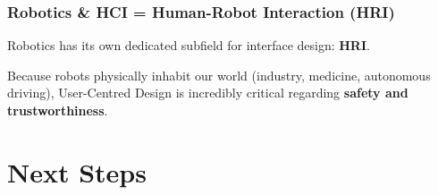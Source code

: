 \documentclass[xcolor=table]{beamer}
\begin{document}
\begin{frame}
    \frametitle{Robotics \& HCI = Human-Robot Interaction (HRI)}
    Robotics has its own dedicated subfield for interface design: \textbf{HRI}.
    
    \vspace{0.2cm}
    Because robots physically inhabit our world (industry, medicine, autonomous driving), User-Centred Design is incredibly critical regarding \textbf{safety and trustworthiness}.
    
\end{frame}

\section{Next Steps}

    
\end{document}
